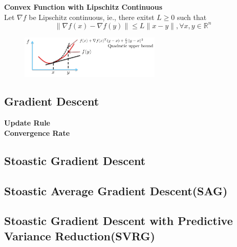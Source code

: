 \documentclass[]{book}
\theoremstyle{definition}
\begin{document}
\textbf{Convex Function with Lipschitz Continuous}\\
Let $\nabla f$ be Lipschitz continuous, ie., there exitst $L \ge 0$ such that $$\rVert  \nabla f(x)- \nabla f(y)\rVert \le L \rVert x-y \rVert, \forall x,y \in \mathbb{R}^n $$
\begin{figure}[!htbp]
\begin{center}
\includegraphics[width=0.6\textwidth]{convexL}
\end{center}
\end{figure}
\subsection*{Gradient Descent}
\textbf{Update Rule}\\
\textbf{Convergence Rate}\\
\subsection*{Stoastic Gradient Descent}
\subsection*{Stoastic Average Gradient Descent(SAG)}
\subsection*{Stoastic Gradient Descent with Predictive Variance Reduction(SVRG)}
\end{document}
